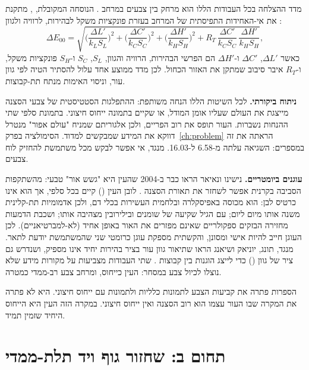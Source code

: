 מדד ההצלחה בכל העבודות הללו הוא מרחק בין צבעים במרחב . הנוסחה המקובלת, , מתקנת את אי-האחידות התפיסתית של המרחב בעזרת פונקציות משקל לבהירות, לרוויה ולגוון \cite{sharma2005ciede2000}:
\begin{equation}
\Delta E_{00} = \sqrt{\Big(\frac{\Delta L'}{k_L S_L}\Big)^2 + \Big(\frac{\Delta C'}{k_C S_C}\Big)^2 + \Big(\frac{\Delta H'}{k_H S_H}\Big)^2 + R_T\,\frac{\Delta C'}{k_C S_C}\,\frac{\Delta H'}{k_H S_H}} ,
\label{eq:de00}
\end{equation}
כאשר $\Delta L'$, $\Delta C'$ ו-$\Delta H'$ הם הפרשי הבהירות, הרוויה והגוון, $S_L$, $S_C$ ו-$S_H$ פונקציות משקל, ו-$R_T$ איבר סיבוב שמתקן את האזור הכחול. לכן מדד ממוצע אחד עלול להסתיר הטיה לפי גוון עור, וניסוי האימות מנתח תת-קבוצות.

\textbf{ניתוח ביקורתי.} לכל השיטות הללו הנחה משותפת: ההתפלגות הסטטיסטית של צבעי הסצנה מייצגת את העולם שעליו אומן המודל, או שקיים בתמונה ייחוס חיצוני. בתמונת סלפי שתי ההנחות נשברות. העור תופס את רוב הפריים, ולכן אלגוריתם שמניח "עולם אפור" מנטרל דווקא את המידע שמבקשים למדוד. הסימולציה בפרק~\ref{ch:problem} הראתה את זה במספרים: השגיאה עלתה מ-\num{6.58} ל-\num{16.03}. מנגד, אי אפשר לבקש מכל משתמשת להחזיק לוח צבעים.

\textbf{עוגנים ביומטריים.} נישינו ונאיאר הראו כבר ב-\num{2004} שהעין היא "גשש אור" טבעי: מהשתקפות הסביבה בקרנית אפשר לשחזר את תאורת הסצנה \cite{nishino2004eyes}. לובן העין () קיים בכל סלפי, אך הוא אינו כרטיס לבן: הוא מכוסה באפיסקלרה ובלחמית העשירות בכלי דם, ולכן אדמומיות תת-קלינית משנה אותו מיום ליום; עם הגיל שקיעה של שומנים ובילירובין מצהיבה אותו; ושכבת הדמעות מחזירה הבזקים ספקולריים שאינם מפזרים את האור באופן אחיד (לא-למברטיאניים). לכן העוגן חייב להיות אישי ומסונן, והקשתית מספקת עוגן כרומטי שני שהמשתמשת יודעת לתאר. מנגד, תונג, יוניאק ושיאנג הראו שתיאור גוון עור בציר בהירות יחיד אינו מספיק, ושנדרש גם ציר של גוון () כדי לייצג הוגנות בין קבוצות \cite{thong2023skin}. שתי העבודות מצביעות על מקורות מידע שלא נוצלו לכיול צבע במסחר: העין כייחוס, ומרחב צבע רב-ממדי כמטרה.

\begin{keymessagebox}
הספרות פתרה את קביעות הצבע לתמונות כלליות ולתמונות עם ייחוס חיצוני. היא לא פתרה את המקרה שבו העור עצמו הוא רוב הסצנה ואין ייחוס חיצוני. במקרה הזה העין היא הייחוס היחיד שזמין תמיד.
\end{keymessagebox}

\section{תחום ב: שחזור גוף ויד תלת-ממדי}
\label{sec:lit-body}

